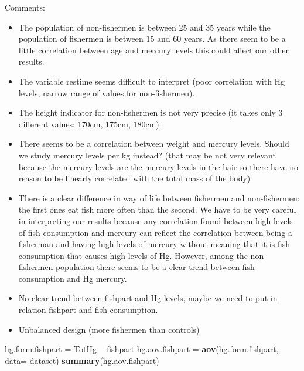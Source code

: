 \documentclass[12pt,]{article}
\newenvironment{Shaded}{\begin{snugshade}}{\end{snugshade}}
\newcommand{\KeywordTok}[1]{\textcolor[rgb]{0.13,0.29,0.53}{\textbf{#1}}}
\newcommand{\DataTypeTok}[1]{\textcolor[rgb]{0.13,0.29,0.53}{#1}}
\newcommand{\StringTok}[1]{\textcolor[rgb]{0.31,0.60,0.02}{#1}}
\newcommand{\OperatorTok}[1]{\textcolor[rgb]{0.81,0.36,0.00}{\textbf{#1}}}
\newcommand{\NormalTok}[1]{#1}
\begin{document}
Comments:

\begin{itemize}
\item
  The population of non-fishermen is between 25 and 35 years while the
  population of fishermen is between 15 and 60 years. As there seem to
  be a little correlation between age and mercury levels this could
  affect our other results.
\item
  The variable restime seems difficult to interpret (poor correlation
  with Hg levels, narrow range of values for non-fishermen).
\item
  The height indicator for non-fishermen is not very precise (it takes
  only 3 different values: 170cm, 175cm, 180cm).
\item
  There seems to be a correlation between weight and mercury levels.
  Should we study mercury levels per kg instead? (that may be not very
  relevant because the mercury levels are the mercury levels in the hair
  so there have no reason to be linearly correlated with the total mass
  of the body)
\item
  There is a clear difference in way of life between fishermen and
  non-fishermen: the first ones eat fish more often than the second. We
  have to be very careful in interpreting our results because any
  correlation found between high levels of fish consumption and mercury
  can reflect the correlation between being a fisherman and having high
  levels of mercury without meaning that it is fish consumption that
  causes high levels of Hg. However, among the non-fishermen population
  there seems to be a clear trend between fish consumption and Hg
  mercury.
\item
  No clear trend between fishpart and Hg levels, maybe we need to put in
  relation fishpart and fish consumption.
\item
  Unbalanced design (more fishermen than controls)
\end{itemize}

\begin{Shaded}
\begin{Highlighting}[]
\NormalTok{hg.form.fishpart =}\StringTok{ }\NormalTok{TotHg }\OperatorTok{~}\StringTok{ }\NormalTok{fishpart}
\NormalTok{hg.aov.fishpart =}\StringTok{ }\KeywordTok{aov}\NormalTok{(hg.form.fishpart, }\DataTypeTok{data=}\NormalTok{ dataset)}
\KeywordTok{summary}\NormalTok{(hg.aov.fishpart)}
\end{Highlighting}
\end{Shaded}
\end{document}
